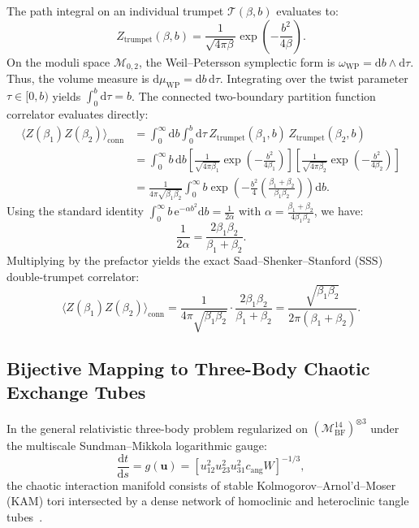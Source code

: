 \documentclass[11pt,a4paper,reqno]{article}
\theoremstyle{plain}
\theoremstyle{definition}
\theoremstyle{remark}
\numberwithin{equation}{section}
\newcommand{\Mbf}{\mathcal{M}_{\mathrm{BF}}^{14}}
\providecommand{\diff}{\mathrm{d}}
\begin{document}
The path integral on an individual trumpet $\mathcal{T}(\beta, b)$ evaluates to:
\begin{equation}
  Z_{\mathrm{trumpet}}(\beta, b) = \frac{1}{\sqrt{4\pi \beta}} \exp\left( - \frac{b^2}{4\beta} \right).
\end{equation}
On the moduli space $\mathcal{M}_{0,2}$, the Weil--Petersson symplectic form is $\omega_{\mathrm{WP}} = \diff b \wedge \diff \tau$. Thus, the volume measure is $\diff \mu_{\mathrm{WP}} = \diff b \, \diff \tau$. Integrating over the twist parameter $\tau \in [0, b)$ yields $\int_0^b \diff \tau = b$. The connected two-boundary partition function correlator evaluates directly:
\begin{align}
  \langle Z(\beta_1) Z(\beta_2) \rangle_{\mathrm{conn}} &= \int_0^\infty \diff b \int_0^b \diff \tau \, Z_{\mathrm{trumpet}}(\beta_1, b) \, Z_{\mathrm{trumpet}}(\beta_2, b) \\
  &= \int_0^\infty b \, \diff b \left[ \frac{1}{\sqrt{4\pi \beta_1}} \exp\left( - \frac{b^2}{4\beta_1} \right) \right] \left[ \frac{1}{\sqrt{4\pi \beta_2}} \exp\left( - \frac{b^2}{4\beta_2} \right) \right] \\
  &= \frac{1}{4\pi \sqrt{\beta_1 \beta_2}} \int_0^\infty b \exp\left( - \frac{b^2}{4} \left( \frac{\beta_1 + \beta_2}{\beta_1 \beta_2} \right) \right) \diff b.
\end{align}
Using the standard identity $\int_0^\infty b \, \mathrm{e}^{-\alpha b^2} \diff b = \frac{1}{2\alpha}$ with $\alpha = \frac{\beta_1 + \beta_2}{4 \beta_1 \beta_2}$, we have:
\begin{equation}
  \frac{1}{2\alpha} = \frac{2 \beta_1 \beta_2}{\beta_1 + \beta_2}.
\end{equation}
Multiplying by the prefactor yields the exact Saad--Shenker--Stanford (SSS) double-trumpet correlator:
\begin{equation}
  \langle Z(\beta_1) Z(\beta_2) \rangle_{\mathrm{conn}} = \frac{1}{4\pi \sqrt{\beta_1 \beta_2}} \cdot \frac{2 \beta_1 \beta_2}{\beta_1 + \beta_2} = \frac{\sqrt{\beta_1 \beta_2}}{2\pi (\beta_1 + \beta_2)}.
  \label{eq:sss_correlator}
\end{equation}

\subsection{Bijective Mapping to Three-Body Chaotic Exchange Tubes}
\label{subsec:bijective_mapping_tubes}
In the general relativistic three-body problem regularized on $(\Mbf)^{\otimes 3}$ under the multiscale Sundman--Mikkola logarithmic gauge:
\begin{equation}
  \frac{\diff t}{\diff s} = g(\mathbf{u}) = \left[ u_{12}^2 u_{23}^2 u_{31}^2 c_{\mathrm{ang}} W \right]^{-1/3},
\end{equation}
the chaotic interaction manifold consists of stable Kolmogorov--Arnol'd--Moser (KAM) tori intersected by a dense network of homoclinic and heteroclinic tangle tubes~\cite{MikkolaTanikawa1999}.
\end{document}
